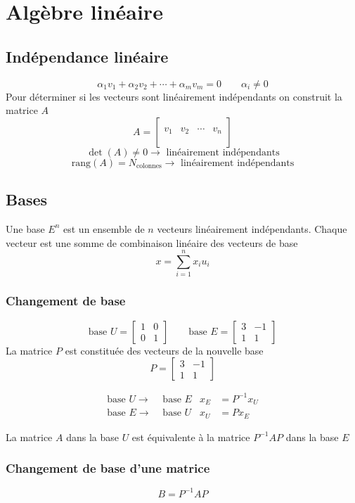 \documentclass[resume]{subfiles}
\begin{document}
\section{Algèbre linéaire}
\subsection{Indépendance linéaire}
$$\alpha_1 v_1+\alpha_2v_2+\cdots+\alpha_mv_m=0\qquad \alpha_i\neq 0$$
Pour déterminer si les vecteurs sont linéairement indépendants on construit la matrice $A$
$$A=\begin{bmatrix}
\\
v_1 & v_2 & \cdots & v_n\\
\\
\end{bmatrix}$$
$$\det(A)\neq 0\longrightarrow \text{ linéairement indépendants}$$
$$\text{rang}(A)=N_\text{colonnes}\longrightarrow \text{ linéairement indépendants}$$
\subsection{Bases}
Une base $E^n$ est un ensemble de $n$ vecteurs linéairement indépendants. Chaque vecteur est une somme de combinaison linéaire des vecteurs de base
$$x=\sum_{i=1}^{n} x_iu_i$$
\subsubsection{Changement de base}
$$\text{base }U=\begin{bmatrix}
1 & 0\\
0 & 1
\end{bmatrix}\qquad \text{base }E=\begin{bmatrix}
3 & -1\\
1 & 1
\end{bmatrix}$$
La matrice $P$ est constituée des vecteurs de la nouvelle base
$$P=\begin{bmatrix}
3 & -1\\
1 & 1
\end{bmatrix}$$

\begin{align*}
\text{base }U\longrightarrow &\text{ base }E & x_E&=P^{-1}x_U\\
\text{base }E\longrightarrow &\text{ base }U & x_U&=Px_E
\end{align*}

La matrice $A$ dans la base $U$ est équivalente à la matrice
$P^{-1}AP$ dans la base $E$  
\subsubsection{Changement de base d'une matrice}
$$B=P^{-1}AP$$
\end{document}
